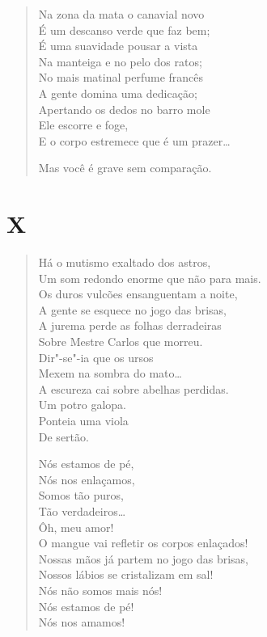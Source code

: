 {\begin{verse}
Na zona da mata o canavial novo\\
É um descanso verde que faz bem;\\
É uma suavidade pousar a vista\\
Na manteiga e no pelo dos ratos;\\
No mais matinal perfume francês\\
A gente domina uma dedicação;\\
Apertando os dedos no barro mole\\
Ele escorre e foge,\\
E o corpo estremece que é um prazer\ldots{}

Mas você é grave sem comparação.
\end{verse}

\pagebreak
\section*{X}

\begin{verse}
Há o mutismo exaltado dos astros,\\
Um som redondo enorme que não para mais.\\
Os duros vulcões ensanguentam a noite,\\
A gente se esquece no jogo das brisas,\\
A jurema perde as folhas derradeiras\\
Sobre Mestre Carlos que morreu.\\
Dir"-se"-ia que os ursos\\
Mexem na sombra do mato\ldots{}\\
A escureza cai sobre abelhas perdidas.\\
Um potro galopa.\\
Ponteia uma viola\\
De sertão.

Nós estamos de pé,\\
Nós nos enlaçamos,\\
Somos tão puros,\\
Tão verdadeiros\ldots{}\\
Ôh, meu amor!\\
O mangue vai refletir os corpos enlaçados!\\
Nossas mãos já partem no jogo das brisas,\\
Nossos lábios se cristalizam em sal!\\
Nós não somos mais nós!\\
Nós estamos de pé!\\
Nós nos amamos!
\end{verse}


}
